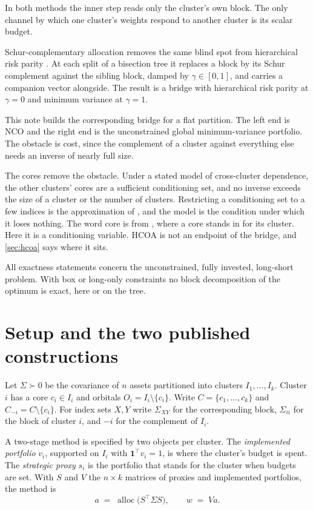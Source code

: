 \documentclass[11pt]{article}
\newcommand{\ones}{\mathbf{1}}
\begin{document}
In both methods the inner step reads only the cluster's own block. The only
channel by which one cluster's weights respond to another cluster is its
scalar budget.

Schur-complementary allocation \parencite{cotton2024schur} removes the same
blind spot from hierarchical risk parity \parencite{lopezdeprado2016}. At
each split of a bisection tree it replaces a block by its Schur complement
against the sibling block, damped by $\gamma\in[0,1]$, and carries a
companion vector alongside. The result is a bridge with hierarchical risk
parity at $\gamma=0$ and minimum variance at $\gamma=1$.

This note builds the corresponding bridge for a flat partition. The left
end is NCO and the right end is the unconstrained global minimum-variance
portfolio. The obstacle is cost, since the complement of a cluster against
everything else needs an inverse of nearly full size.

The cores remove the obstacle. Under a stated model of cross-cluster
dependence, the other clusters' cores are a sufficient conditioning set,
and no inverse exceeds the size of a cluster or the number of clusters.
Restricting a conditioning set to a few indices is the approximation of
\textcite{vecchia1988}, and the model is the condition under which it loses
nothing. The word core is from \textcite{hcoa2026}, where a core stands in
for its cluster. Here it is a conditioning variable. HCOA is not an endpoint
of the bridge, and \cref{sec:hcoa} says where it sits.

All exactness statements concern the unconstrained, fully invested,
long-short problem. With box or long-only constraints no block
decomposition of the optimum is exact, here or on the tree.

\section{Setup and the two published constructions}

Let $\Sigma\succ0$ be the covariance of $n$ assets partitioned into
clusters $I_1,\dots,I_k$. Cluster $i$ has a core $c_i\in I_i$ and orbitals
$O_i=I_i\setminus\{c_i\}$. Write $C=\{c_1,\dots,c_k\}$ and
$C_{-i}=C\setminus\{c_i\}$. For index sets $X,Y$ write $\Sigma_{XY}$ for the
corresponding block, $\Sigma_{ii}$ for the block of cluster $i$, and $-i$
for the complement of $I_i$.

A two-stage method is specified by two objects per cluster. The
\emph{implemented portfolio} $v_i$, supported on $I_i$ with
$\ones^\top v_i=1$, is where the cluster's budget is spent. The
\emph{strategic proxy} $s_i$ is the portfolio that stands for the cluster
when budgets are set. With $S$ and $V$ the $n\times k$ matrices of proxies
and implemented portfolios, the method is
\begin{equation}
  a \;=\; \operatorname{alloc}\!\big(S^\top\Sigma S\big),
  \qquad w \;=\; Va .
  \label{eq:twostage}
\end{equation}
\end{document}
